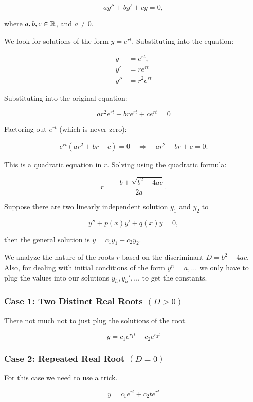 \[
    a y'' + b y' + c y = 0,
\]

where \( a, b, c \in \mathbb{R} \), and \( a \neq 0 \).

We look for solutions of the form \( y = e^{rt} \). Substituting into the equation:

\begin{align*}
    y &= e^{rt}, \\
    y' &= r e^{rt} \\
    y'' &=  r^2 e^{rt}
\end{align*}

Substituting into the original equation:

\[
    ar^2 e^{rt} + bre^{rt} + ce^{rt} = 0
\]

Factoring out \( e^{rt} \) (which is never zero):

\[
    e^{rt}(ar^2 + br + c) = 0 \quad \Rightarrow \quad ar^2 + br + c = 0.
\]

This is a quadratic equation in \( r \). Solving using the quadratic formula:

\[
    r = \frac{-b \pm \sqrt{b^2 - 4ac}}{2a}.
\]

Suppose there are two linearly independent solution \(y_1\) and \(y_2\) to

\[
    y'' + p(x)y' + q(x)y = 0,
\]

then the general solution is \(y = c_1 y_1 + c_2 y_2\).

We analyze the nature of the roots \( r \) based on the discriminant \( D = b^2 - 4ac \).
Also, for dealing with initial conditions of the form \(y^n = a, \dots\) we only have to 
plug the values into our solutions \(y_h, y_{h}', \dots \) to get the constants.

\subsubsection{Case 1: Two Distinct Real Roots \texorpdfstring{\( (D > 0) \)}{}}

There not much not to just plug the solutions of the root.

\[
    y = c_1 e^{r_1 t} + c_2 e^{r_2 t}
\]

\subsubsection{Case 2: Repeated Real Root \texorpdfstring{\( (D = 0) \)}{}}

For this case we need to use a trick.

\[
    y = c_1 e^{rt} + c_2 te^{rt}
\]


